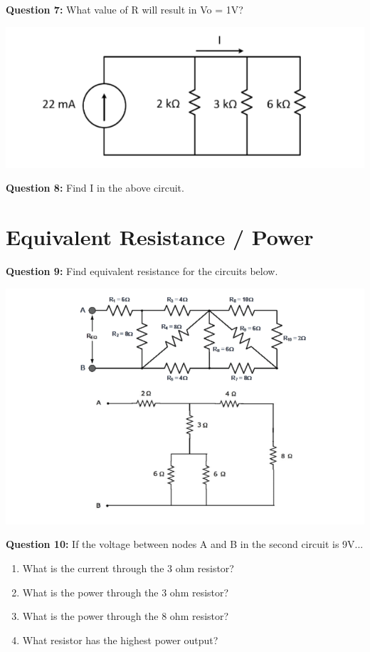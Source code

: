 \documentclass{article}
\begin{document}
\textbf{Question 7:} What value of R will result in Vo = 1V?

\begin{center}
\includegraphics[width=0.75\linewidth]{figures/6.png}
\end{center}

\textbf{Question 8:} Find I in the above circuit.

\section*{Equivalent Resistance / Power}
\textbf{Question 9:} Find equivalent resistance for the circuits below.

\begin{center}

        \includegraphics[width=0.75\linewidth]{figures/image.png}
\end{center}

\textbf{Question 10:} If the voltage between nodes A and B in the second circuit is 9V...
\begin{enumerate}
\item What is the current through the 3 ohm resistor?
\item What is the power through the 3 ohm resistor?
\item What is the power through the 8 ohm resistor?
\item What resistor has the highest power output?
\end{enumerate}
\end{document}
